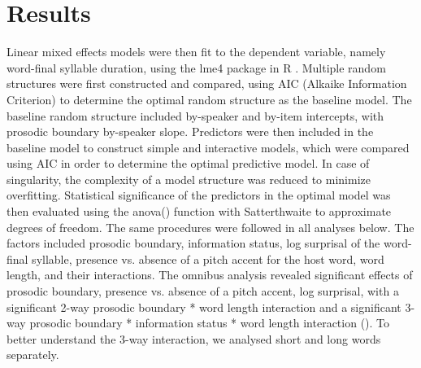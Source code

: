 \documentclass[output=paper,colorlinks,citecolor=brown]{langscibook}
\begin{document}
\section{Results}
Linear mixed effects models were then fit to the dependent variable, namely word-final syllable duration, using the lme4 package \citep{Bates2015} in R \citep{R2022}. Multiple random structures were first constructed and compared, using AIC  (Alkaike Information Criterion) to determine the optimal random structure as the baseline model. The baseline random structure included by-speaker and by-item intercepts, with prosodic boundary by-speaker slope. Predictors were then included in the baseline model to construct simple and interactive models, which were compared using AIC in order to determine the optimal predictive model. In case of singularity, the complexity of a model structure was reduced to minimize overfitting. Statistical significance of the predictors in the optimal model was then evaluated using the anova() function with Satterthwaite to approximate degrees of freedom. The same procedures were followed in all analyses below. The factors included prosodic boundary, information status, log surprisal of the word-final syllable, presence vs. absence of a pitch accent for the host word, word length, and their interactions. 
The omnibus analysis revealed significant effects of prosodic boundary, presence vs. absence of a pitch accent, log surprisal, with a significant 2-way prosodic boundary * word length interaction and a significant 3-way prosodic boundary * information status * word length interaction (). To better understand the 3-way interaction, we analysed short and long words separately.
\end{document}
